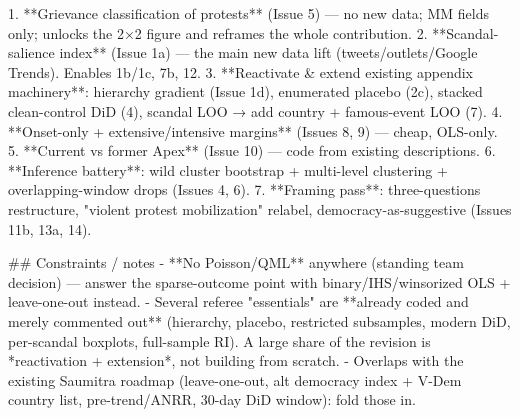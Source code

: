 1. **Grievance classification of protests** (Issue 5) — no new data; MM fields
   only; unlocks the 2×2 figure and reframes the whole contribution.
2. **Scandal-salience index** (Issue 1a) — the main new data lift
   (tweets/outlets/Google Trends). Enables 1b/1c, 7b, 12.
3. **Reactivate & extend existing appendix machinery**: hierarchy gradient
   (Issue 1d), enumerated placebo (2c), stacked clean-control DiD (4), scandal
   LOO → add country + famous-event LOO (7).
4. **Onset-only + extensive/intensive margins** (Issues 8, 9) — cheap, OLS-only.
5. **Current vs former Apex** (Issue 10) — code from existing descriptions.
6. **Inference battery**: wild cluster bootstrap + multi-level clustering +
   overlapping-window drops (Issues 4, 6).
7. **Framing pass**: three-questions restructure, "violent protest mobilization"
   relabel, democracy-as-suggestive (Issues 11b, 13a, 14).

## Constraints / notes
- **No Poisson/QML** anywhere (standing team decision) — answer the sparse-outcome
  point with binary/IHS/winsorized OLS + leave-one-out instead.
- Several referee "essentials" are **already coded and merely commented out**
  (hierarchy, placebo, restricted subsamples, modern DiD, per-scandal boxplots,
  full-sample RI). A large share of the revision is *reactivation + extension*,
  not building from scratch.
- Overlaps with the existing Saumitra roadmap (leave-one-out, alt democracy
  index + V-Dem country list, pre-trend/ANRR, 30-day DiD window): fold those in.
